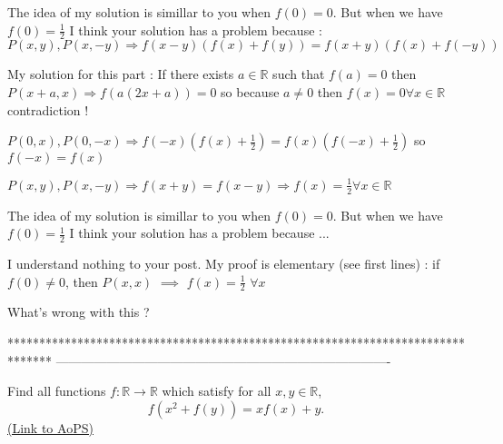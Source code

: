 \begin{solution}
The idea of my solution is  simillar to you when $f(0)=0$. But when we have $f(0)= \frac 12$ I think your solution has a problem because :
$P(x,y), P(x,-y) \Rightarrow  f(x-y)(f(x)+f(y))=f(x+y)(f(x)+f(-y))$

My solution for this part : If there exists $a \in \mathbb{R}$ such that $f(a)=0$ then $P(x+a,x) \Rightarrow f(a(2x+a))=0$ so because $a \neq 0 $ then $f(x)=0 \forall x \in \mathbb{R}$ contradiction !

$P(0,x), P(0,-x) \Rightarrow f(-x)(f(x)+\frac 12)= f(x)(f(-x)+ \frac 12)$ so $f(-x)=f(x)$ 

$P(x,y) , P(x,-y) \Rightarrow f(x+y)=f(x-y) \Rightarrow f(x)= \frac 12 \forall x \in \mathbb{R}$ 


\end{solution}



\begin{solution}
	\begin{tcolorbox} 
The idea of my solution is  simillar to you when $f(0)=0$. But when we have $f(0)= \frac 12$ I think your solution has a problem because ...\end{tcolorbox}
I understand nothing to your post.
My proof is elementary (see first lines) : if $f(0)\ne 0$, then $P(x,x)$  $\implies$ $f(x)=\frac 12$ $\forall x$

What's wrong with this ?
\end{solution}
*******************************************************************************
-------------------------------------------------------------------------------

\begin{problem}
	Find all functions $f: \mathbb R \to \mathbb R$ which satisfy for all $x, y \in \mathbb R$,
\[f(x^{2}+f(y))=xf(x)+y.\]
	\flushright \href{https://artofproblemsolving.com/community/c6h453196}{(Link to AoPS)}
\end{problem}



